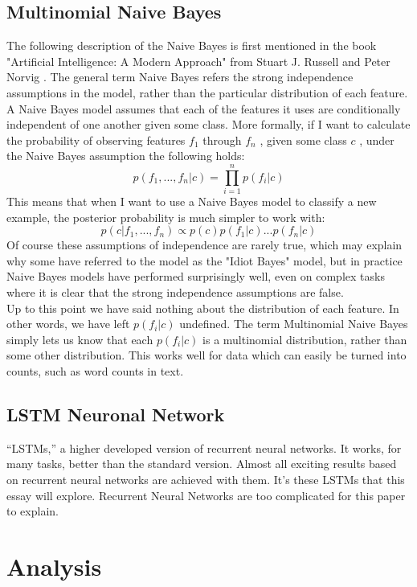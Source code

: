 \documentclass[journal]{IEEEtran}
\begin{document}
\subsection{Multinomial Naive Bayes}
\noindent The following description of the Naive Bayes is first mentioned in the book "Artificial Intelligence: A Modern Approach" from Stuart J. Russell and Peter Norvig \cite{Russell}.
The general term Naive Bayes refers the strong independence assumptions in the model, rather than the particular distribution of each feature. A Naive Bayes model assumes that each of the features it uses are conditionally independent of one another given some class. More formally, if I want to calculate the probability of observing features \(f_1\) through \(f_n\) , given some class \(c\) , under the Naive Bayes assumption the following holds:
\begin{equation}
p(f_1,..., f_n|c) = \prod_{i=1}^n p(f_i|c)
\end{equation}
This means that when I want to use a Naive Bayes model to classify a new example, the posterior probability is much simpler to work with:
\begin{equation}
p(c|f_1,...,f_n) \propto p(c)p(f_1|c)...p(f_n|c)
\end{equation}
Of course these assumptions of independence are rarely true, which may explain why some have referred to the model as the "Idiot Bayes" model, but in practice Naive Bayes models have performed surprisingly well, even on complex tasks where it is clear that the strong independence assumptions are false.\\Up to this point we have said nothing about the distribution of each feature. In other words, we have left \(p(f_i|c)\) undefined. The term Multinomial Naive Bayes simply lets us know that each \(p(f_i|c)\) is a multinomial distribution, rather than some other distribution. This works well for data which can easily be turned into counts, such as word counts in text.
\subsection{LSTM Neuronal Network}
“LSTMs,” a higher developed version of recurrent neural networks. It works, for many tasks, better than the standard version. Almost all exciting results based on recurrent neural networks are achieved with them. It’s these LSTMs that this essay will explore. Recurrent Neural Networks are too complicated for this paper \cite{olah} to explain. 

\section{Analysis}
\end{document}
